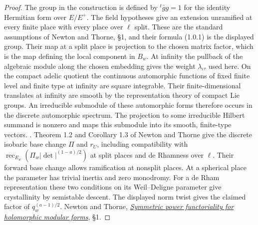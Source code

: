 \begin{proof}
The group in the construction is defined by \({}^{t}\!\bar g g=1\)
for the identity Hermitian form over \(E/E^+\). The field hypotheses
give an extension unramified at every finite place with every place
over \(\ell\) split. These are the standard assumptions of Newton and
Thorne, \S1, and their formula (1.0.1) is the displayed group.
Their map at a split place is projection to the chosen matrix factor,
which is the map defining the local component in \(B_w\). At infinity
the pullback of the algebraic module along the chosen embedding gives
the weight \(\lambda_{\iota\tau}\) used here. On the compact adelic
quotient the continuous automorphic functions of fixed finite level
and finite type at infinity are square integrable. Their finite-dimensional
translates at infinity are smooth by the representation theory of compact
Lie groups. An irreducible submodule of these automorphic forms therefore
occurs in the discrete automorphic spectrum. The projection to some
irreducible Hilbert summand is nonzero and maps this submodule into
its smooth, finite-type vectors.
.
Theorem 1.2 and Corollary 1.3 of Newton and Thorne give the discrete
isobaric base change \(\Pi\) and \(r_U\), including compatibility
with \(\operatorname{rec}_{E_w}(\Pi_w|\det|^{(1-a)/2})\) at split places
and de Rhamness over \(\ell\). Their forward base change allows
ramification at nonsplit places. At a spherical place the parameter has
trivial inertia and zero monodromy. For a de Rham representation these
two conditions on its Weil--Deligne parameter give crystallinity by
semistable descent. The displayed norm twist gives the claimed factor
of \(q_w^{(a-1)/2}\).
Newton and Thorne,
\href{https://arxiv.org/abs/1912.11261}{\emph{Symmetric power functoriality for holomorphic modular forms}}, \S1.


\end{proof}
